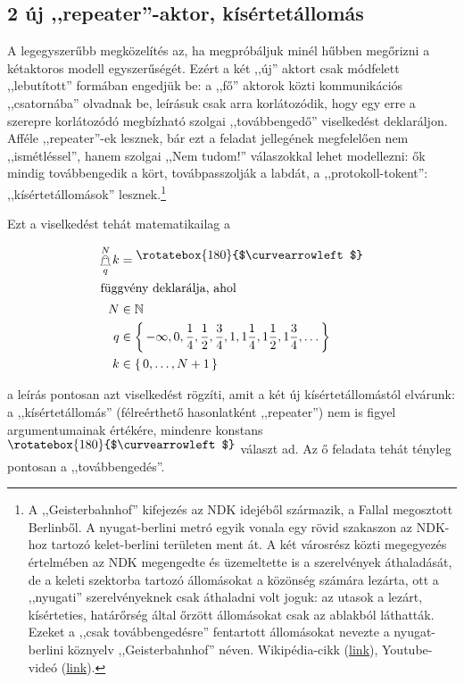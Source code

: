 \documentclass{article}
\newcommand{\nothing}{\text{\raisebox{0.4em}{\rotatebox{180}{$\curvearrowleft$}}}}%
\newcommand{\just}[1]{\boxed{#1}}%
\newcommand{\incl}{\mathbf{incl}}
\newcommand{\excl}{\mathbf{excl}}
\newcommand{\setOf}[1]{\left\lbrace\,#1\,\right\rbrace}
\newcommand{\mainfun}[3]{\mathwitch_{#1}^{#2}#3}
\newcommand{\nomainfun}[3]{\bigskull_{#1}^{#2}#3}
\newcommand{\mainfunA}[3]{\mathwitch_{#2}^{#1}#3}
\newcommand{\nomainfunA}[3]{{}_{\mathwitch}\!\!\!\!\bigskull^{#1}_{#2}#3}
\newcommand{\gbh}[3]{\mathop{\mathghost}^{#1}_{#2}#3}
\begin{document}
	\subsection{2 új ,,repeater''-aktor, kísértetállomás}


	A legegyszerűbb megközelítés az, ha megpróbáljuk minél hűbben megőrizni a kétaktoros modell egyszerűségét. Ezért a két ,,új'' aktort csak módfelett ,,lebutított'' formában engedjük be: a ,,fő'' aktorok közti kommunikációs ,,csatornába'' olvadnak be, leírásuk csak arra korlátozódik, hogy egy erre a szerepre korlátozódó megbízható szolgai ,,továbbengedő'' viselkedést deklaráljon.
	Afféle ,,repeater''-ek lesznek, bár ezt a feladat jellegének megfelelően nem ,,ismétléssel'', hanem szolgai ,,Nem tudom!'' válaszokkal lehet modellezni: ők mindig továbbengedik a kört, továbpasszolják a labdát, a ,,protokoll-tokent'': ,,kísértetállomások'' lesznek.\footnote{A ,,Geisterbahnhof'' kifejezés az NDK idejéből származik, a Fallal megosztott Berlinből. A nyugat-berlini metró egyik vonala  egy rövid szakaszon az NDK-hoz tartozó kelet-berlini területen ment át. A két városrész közti megegyezés értelmében az NDK megengedte és  üzemeltette is a szerelvények áthaladását, de a keleti szektorba tartozó állomásokat a közönség számára lezárta, ott a ,,nyugati'' szerelvényeknek csak áthaladni volt joguk: az utasok a lezárt, kísérteties, határőrség által őrzött állomásokat csak az ablakból láthatták. Ezeket a ,,csak továbbengedésre'' fentartott állomásokat nevezte a nyugat-berlini köznyelv ,,Geisterbahnhof'' néven. Wikipédia-cikk (\href{https://en.wikipedia.org/wiki/Ghost_station}{link}), Youtube-videó (\href{https://www.youtube.com/watch?v=jSwbcCx8rfQ}{link}).}

	Ezt a viselkedést tehát matematikailag a
	
	\begin{align*}
		\gbh Nqk &= \nothing\\\intertext{függvény deklarálja, ahol}
		N &\in \mathbb N\\
		q &\in \setOf{-\infty, 0, \frac14, \frac12, \frac34, 1, 1\frac14, 1\frac12, 1\frac34, \dots}\\
		k &\in \setOf{0, \dots, N + 1}
	\end{align*}

	a leírás pontosan azt viselkedést rögzíti, amit a két új kísértetállomástól elvárunk: a ,,kísértetállomás'' (félreérthető hasonlatként ,,repeater'') nem is figyel argumentumainak értékére, mindenre konstans $\nothing$ választ ad. Az ő feladata tehát tényleg pontosan a ,,továbbengedés''.
\end{document}
